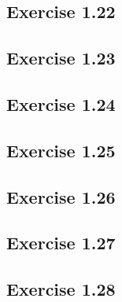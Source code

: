 \documentclass[../A&M.tex]{subfiles}
\begin{document}
\subsection*{Exercise 1.22}

\subsection*{Exercise 1.23}

\subsection*{Exercise 1.24}

\subsection*{Exercise 1.25}

\subsection*{Exercise 1.26}

\subsection*{Exercise 1.27}

\subsection*{Exercise 1.28}
\phantom{}
\end{document}
